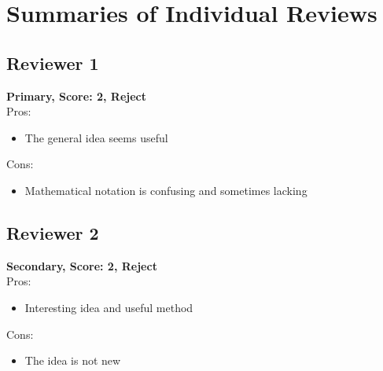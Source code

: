
\section{Summaries of Individual Reviews} \label{sec:reviewSummary}

\subsection{Reviewer 1}
\textbf{Primary, Score: 2, Reject} \\

Pros:
\begin{itemize}[itemsep=1pt,parsep=1pt]
    \item The general idea seems useful
\end{itemize}


Cons: 
\begin{itemize}[itemsep=1pt,parsep=1pt]
    \item Mathematical notation is confusing and sometimes lacking
\end{itemize}


\subsection{Reviewer 2}
\textbf{Secondary, Score: 2, Reject} \\

Pros: 
\begin{itemize}[itemsep=1pt,parsep=1pt]
    \item Interesting idea and useful method
\end{itemize}

Cons:
\begin{itemize}[itemsep=1pt,parsep=1pt]
    \item The idea is not new 
\end{itemize}


